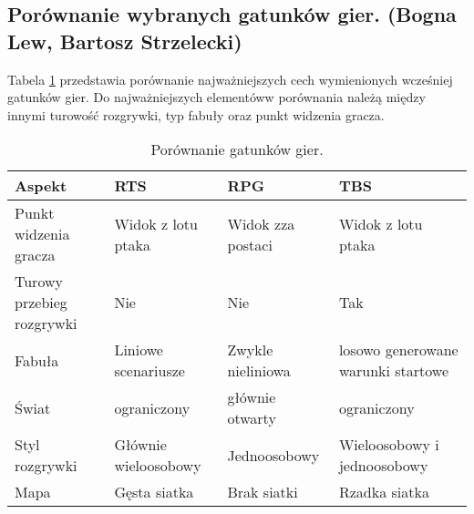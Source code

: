 \subsection{Porównanie wybranych gatunków gier. (Bogna Lew, Bartosz Strzelecki)}\label{ss:comp}
Tabela \ref{fig:por_gier} przedstawia porównanie najważniejszych cech wymienionych wcześniej gatunków gier. Do
najważniejszych elementóww porównania należą między innymi turowość rozgrywki, typ fabuły oraz punkt widzenia gracza.

\begin{table}[h]
\caption{Porównanie gatunków gier.}
\begin{center}
\begin{tabular}{| m{11em} | m{10em} | m{10em} | m{10em}|} 
 \hline
 Aspekt & RTS & RPG & TBS \\
 \hline \hline
 Punkt widzenia gracza & Widok z lotu ptaka & Widok zza postaci & Widok z lotu ptaka \\
 \hline
 Turowy przebieg rozgrywki & Nie & Nie & Tak \\
 \hline
 Fabuła & Liniowe scenariusze & Zwykle nieliniowa & losowo generowane warunki startowe \\
 \hline
 Świat & ograniczony & głównie otwarty & ograniczony \\
 \hline
 Styl rozgrywki & Głównie wieloosobowy & Jednoosobowy & Wieloosobowy i jednoosobowy \\
 \hline
 Mapa & Gęsta siatka & Brak siatki & Rzadka siatka \\
 \hline
\end{tabular}
\end{center}
\label{fig:por_gier}
\end{table}
